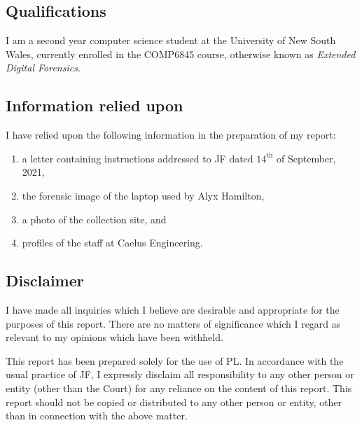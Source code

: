 
\subsection{Qualifications} %
\begin{myenum}
     \item I am a second year computer science student at the University of New South Wales, currently enrolled in the COMP6845 course, otherwise known as \emph{Extended Digital Forensics}.
\end{myenum}
\label{sub:qualifications}


\subsection{Information relied upon} %
\label{sub:information_relied_upon}

\begin{myenum}
     \item I have relied upon the following information in the preparation of my report:
         \begin{enumerate}
            \item a letter containing instructions addressed to JF dated $14^\text{th}$ of September, 2021,
            \item the forensic image of the laptop used by Alyx Hamilton,
            \item a photo of the collection site, and 
            \item profiles of the staff at Caelus Engineering.
         \end{enumerate}
\end{myenum}


\subsection{Disclaimer} %
\begin{myenum}
     \item I have made all inquiries which I believe are desirable and appropriate for the purposes of this report. There are no matters of significance which I regard as relevant to my opinions which have been withheld.
     \item This report has been prepared solely for the use of PL. In accordance with the usual practice of JF, I expressly disclaim all responsibility to any other person or entity (other than the Court) for any reliance on the content of this report. This report should not be copied or distributed to any other person or entity, other than in connection with the above matter.
\end{myenum}
\label{sub:disclaimer}

